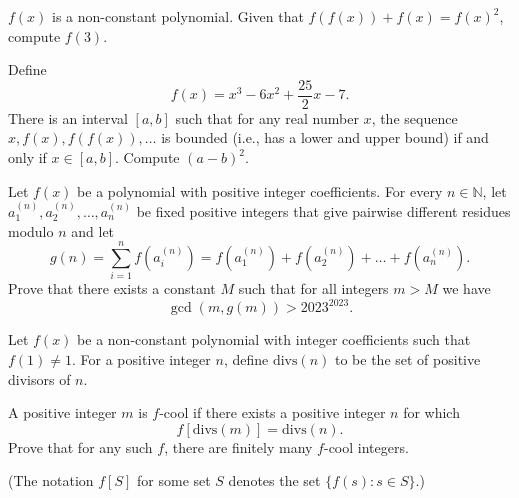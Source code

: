 \documentclass[11pt]{article}
\theoremstyle{definition}
\begin{document}
\begin{question}[name={2023 Stanford Math Tournament, \href{https://artofproblemsolving.com/community/c383h3065231p27653943}{Algebra Tiebreaker \#2}}]
	$f(x)$ is a non-constant polynomial. Given that $f(f(x)) + f(x) = f(x)^2$, compute $f(3)$.	
\end{question}



%	



\begin{question}[name={2023 Stanford Math Tournament, \href{https://artofproblemsolving.com/community/c383h3065232p27653957}{Algebra Tiebreaker \#3}}]
	Define $$f(x)=x^3-6x^2+\frac{25}{2}x-7.$$ There is an interval $[a,b]$ such that for any real number $x$, the sequence $x,f(x),f(f(x)),\dots$ is bounded (i.e., has a lower and upper bound) if and only if $x\in[a,b]$. Compute $(a-b)^2$.
\end{question}



%	




\begin{question}[name={2023 Bulgaria National Olympiad, \href{https://artofproblemsolving.com/community/c6h3048321p27461669}{Problem 3}}]
	Let $f(x)$ be a polynomial with positive integer coefficients. For every $n\in\mathbb{N}$, let $a_{1}^{(n)}, a_{2}^{(n)}, \dots , a_{n}^{(n)}$ be fixed positive integers that give pairwise different residues modulo $n$ and let
	\[g(n) = \sum\limits_{i=1}^{n} f(a_{i}^{(n)}) = f(a_{1}^{(n)}) + f(a_{2}^{(n)}) + \dots  + f(a_{n}^{(n)}).\]Prove that there exists a constant $M$ such that for all integers $m>M$ we have $$\gcd(m, g(m))>2023^{2023}.$$
\end{question}

%	


\begin{question}[name={2023 Canada National Olympiad, \href{https://artofproblemsolving.com/community/c6h3029964p27258241}{Problem 4}}]
	Let $f(x)$ be a non-constant polynomial with integer coefficients such that $f(1) \neq 1$. For a positive integer $n$, define $\text{divs}(n)$ to be the set of positive divisors of $n$.
	
	A positive integer $m$ is $f$-cool if there exists a positive integer $n$ for which$$f[\text{divs}(m)]=\text{divs}(n).$$Prove that for any such $f$, there are finitely many $f$-cool integers.
	
	(The notation $f[S]$ for some set $S$ denotes the set $\{f(s):s \in S\}$.)
\end{question}
\end{document}
